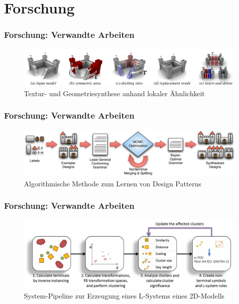 \documentclass[12pt]{beamer}
\begin{document}
    \section{Forschung}
    \label{sec:forschung}
    \begin{frame}
        \frametitle{Forschung: Verwandte Arbeiten}

        \begin{figure}
            \centering
            \includegraphics[width=12cm]{../images/bokeloh_2010_system.PNG}
            \caption{Textur- und Geometriesynthese anhand lokaler Ähnlichkeit}
        \end{figure}
    \end{frame}

    \begin{frame}
        \frametitle{Forschung: Verwandte Arbeiten}

        \begin{figure}
            \centering
            \includegraphics[width=12cm]{../images/talton_2012_system.PNG}
            \caption{Algorithmische Methode zum Lernen von Design Patterns}
        \end{figure}
    \end{frame}

    \begin{frame}
        \frametitle{Forschung: Verwandte Arbeiten}

        \begin{figure}
            \centering
            \includegraphics[width=12cm]{../images/stava_2010_system.PNG}
            \caption{System-Pipeline zur Erzeugung eines L-Systems eines 2D-Modells}
        \end{figure}
    \end{frame}
\end{document}
